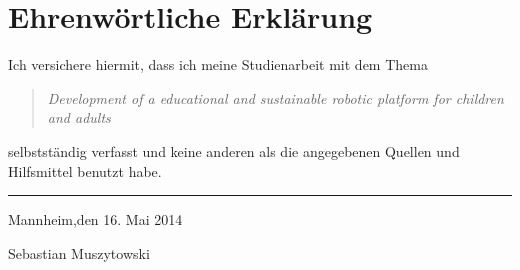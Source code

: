 \documentclass[	a4paper,11pt,oneside,			%
		listof=totoc,bibliography=totoc,	%
		titlepage,				%
		headsepline,				%
		BCOR5mm,	 			%
		2.1headlines,				%
		numbers=noenddot,			%
		parskip=full]{scrreprt}			%
\newcommand{\titel}{Development of a educational and sustainable robotic platform for children and adults}
\newcommand{\untertitel}{}
\newcommand{\autor}{Sebastian Muszytowski}
\newcommand{\ort}{Mannheim}
\begin{document}
\tableofcontents

\clearpage
\pagestyle{headings}
\renewcommand*{\chapterpagestyle}{plain}

\printnomenclature[2.0cm]
\listoffigures
\listoftables
\pagebreak

\onehalfspacing



\singlespacing
\nocite{*}

%



\appendix
\clearpage



\clearpage
\pagestyle{empty}
\renewcommand{\chapterpagestyle}{empty}
\singlespacing
\chapter*{Ehrenwörtliche Erklärung}
Ich versichere hiermit, dass ich meine Studienarbeit mit dem Thema
\begin{quote}
 \textit{\titel} %
\end{quote}
selbstständig verfasst und keine anderen als die angegebenen Quellen und Hilfsmittel benutzt habe.

\vspace{22pt}

\rule[-0.2cm]{5cm}{0.5pt} \hfill \ort,den 16. Mai 2014

\autor
\end{document}
